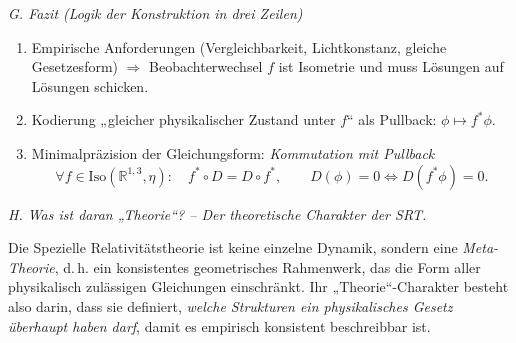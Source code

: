 \documentclass[10pt, letterpaper]{article}
\newcommand{\R}{\mathbb{R}}
\begin{document}
\bigskip
\emph{G. Fazit (Logik der Konstruktion in drei Zeilen)}
\begin{enumerate}
\item Empirische Anforderungen (Vergleichbarkeit, Lichtkonstanz, gleiche Gesetzesform)
$\Longrightarrow$ Beobachterwechsel $f$ ist Isometrie und muss Lösungen auf Lösungen schicken.
\item Kodierung „gleicher physikalischer Zustand unter $f$“ als Pullback: $\phi\mapsto f^*\phi$.
\item Minimalpräzision der Gleichungsform: \emph{Kommutation mit Pullback}
\[
\boxed{\forall f\in\mathrm{Iso}(\R^{1,3},\eta):\quad f^*\circ D = D\circ f^*,\qquad
D(\phi)=0 \iff D(f^*\phi)=0.}
\]
\end{enumerate}

\bigskip

\emph{H. Was ist daran „Theorie“? – Der theoretische Charakter der SRT.}

Die Spezielle Relativitätstheorie ist keine einzelne Dynamik, sondern eine 
\emph{Meta-Theorie}, d.\,h. ein konsistentes geometrisches Rahmenwerk, das 
die Form aller physikalisch zulässigen Gleichungen einschränkt. 
Ihr „Theorie“-Charakter besteht also darin, dass sie definiert, 
\emph{welche Strukturen ein physikalisches Gesetz überhaupt haben darf}, 
damit es empirisch konsistent beschreibbar ist.  
\end{document}
